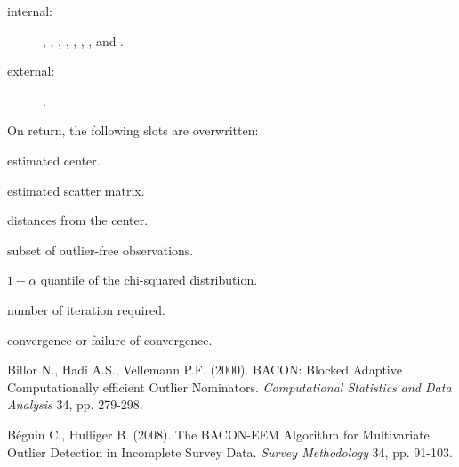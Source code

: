 \documentclass[a4paper,oneside,10pt,DIV=12]{scrreprt}
\begin{document}
\begin{Dependencies}
	\begin{description}
		\item[internal:]
		, 
		, 
		, 
		, 
		, 
		, 
		, and
		. 
		\item[external:]
		.  
	\end{description}
\end{Dependencies}
\begin{Value}
On return, the following slots are overwritten:
	\begin{ldescription}
		\item[\code{center}] estimated center.
		\item[\code{scatter}] estimated scatter matrix.
		\item[\code{dist}] distances from the center.
		\item[\code{subset0}] subset of outlier-free observations.
		\item[\code{cutoff}] $1-\alpha$ quantile of the chi-squared
			distribution.
		\item[\code{maxiter}] number of iteration required.
		\item[\code{success}] convergence or failure of convergence. 
	\end{ldescription}
\end{Value}

\begin{References}
Billor N., Hadi A.S., Vellemann P.F. (2000). BACON: Blocked Adaptive 
Computationally efficient Outlier Nominators. \textit{Computational Statistics
and Data Analysis} 34, pp. 279-298.

B{\'e}guin C., Hulliger B. (2008). The BACON-EEM Algorithm for Multivariate 
Outlier Detection in Incomplete Survey Data. \textit{Survey Methodology} 34, 
pp. 91-103. 
\end{References}
\end{document}
